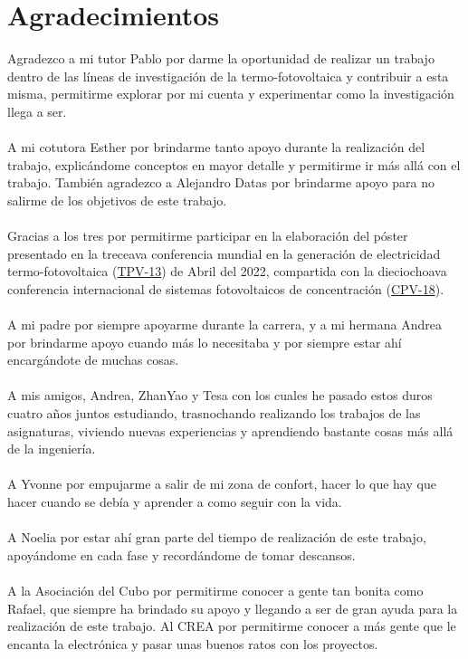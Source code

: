 \chapter{Agradecimientos}

Agradezco a mi tutor Pablo por darme la oportunidad de realizar un trabajo dentro de las líneas de investigación de la termo-fotovoltaica y contribuir a esta misma, permitirme explorar por mi cuenta y experimentar como la investigación llega a ser.\\\\
A mi cotutora Esther por brindarme tanto apoyo durante la realización del trabajo, explicándome conceptos en mayor detalle y permitirme ir más allá con el trabajo. También agradezco a Alejandro Datas por brindarme apoyo para no salirme de los objetivos de este trabajo.\\\\
Gracias a los tres por permitirme participar en la elaboración del póster presentado en la treceava conferencia mundial en la generación de electricidad termo-fotovoltaica (\href{https://www.tpv-13.org/}{TPV-13}) de Abril del 2022, compartida con la dieciochoava conferencia internacional de sistemas fotovoltaicos de concentración (\href{https://www.cpv-18.org/}{CPV-18}).\\\\  
A mi padre por siempre apoyarme durante la carrera, y a mi hermana Andrea por brindarme apoyo cuando más lo necesitaba y por siempre estar ahí encargándote de muchas cosas.\\\\
A mis amigos, Andrea, ZhanYao y Tesa con los cuales he pasado estos duros cuatro años juntos estudiando, trasnochando realizando los trabajos de las asignaturas, viviendo nuevas experiencias y aprendiendo bastante cosas más allá de la ingeniería.\\\\
A Yvonne por empujarme a salir de mi zona de confort, hacer lo que hay que hacer cuando se debía y aprender a como seguir con la vida.\\\\
A Noelia por estar ahí gran parte del tiempo de realización de este trabajo, apoyándome en cada fase y recordándome de tomar descansos.\\\\
A la Asociación del Cubo por permitirme conocer a gente tan bonita como Rafael, que siempre ha brindado su apoyo y llegando a ser de gran ayuda para la realización de este trabajo. Al CREA por permitirme conocer a más gente que le encanta la electrónica y pasar unas buenos ratos con los proyectos.\\\\